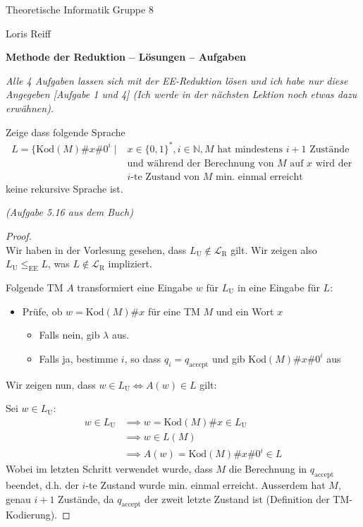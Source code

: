 \documentclass[a4paper,ngerman,12pt]{exam}
\newcommand\kod{\text{Kod}}
\newcommand\Lu{L_{\mathrm{U}}}
\newcommand\LR{\mathcal{L}_{\mathrm{R}}}
\begin{document}
\noindent Theoretische Informatik \hfill Gruppe 8

\hfill Loris Reiff

\begin{center}
  \bfseries\Large
  Methode der Reduktion \ifprintanswers
  -- Lösungen
  \else
  -- Aufgaben
\fi
\end{center}

\noindent\textit{Alle 4 Aufgaben lassen sich mit der EE-Reduktion lösen und ich habe nur diese Angegeben [Aufgabe 1 und 4] (Ich werde in der nächsten Lektion noch etwas dazu erwähnen).}

\begin{questions}
\question
Zeige dass folgende Sprache
\begin{align*}
  L = \{\kod(M)\#x\#0^i \mid &x \in \{0,1\}^*, i \in \mathbb{N}, M
  \text{ hat mindestens } i+1 \text{ Zustände} \\
  &\text{und während der Berechnung von } M
  \text{ auf } x \text{ wird der } \\
  &i \text{-te Zustand von $M$ min. einmal erreicht}
\end{align*}
keine rekursive Sprache ist.

  \textit{(Aufgabe 5.16 aus dem Buch)}
    \begin{solutionorbox}[18em]
      \begin{proof} $ $\\
      Wir haben in der Vorlesung gesehen, dass $\Lu \not\in \LR$ gilt. Wir zeigen also
      $\Lu \leq_{\mathrm{EE}} L$, was $L \not\in \LR$ impliziert.

      Folgende TM $A$ transformiert eine Eingabe $w$ für $\Lu$ in eine Eingabe für $L$:
      \begin{itemize}
      \item Prüfe, ob $w = \kod(M)\#x$ für eine TM $M$ und ein Wort $x$
      \begin{itemize}
        \item Falls nein, gib $\lambda$ aus.
        \item Falls ja, bestimme $i$, so dass $q_i = q_{\text{accept}}$
        und gib $\kod(M)\#x\#0^i$ aus
      \end{itemize}
      \end{itemize}
      Wir zeigen nun, dass $w \in \Lu \iff A(w) \in L$ gilt:

        Sei $w \in \Lu$:
        \begin{align*}
          w \in \Lu &\implies w=\kod(M)\#x \in \Lu \\
          & \implies w \in L(M) \\
          & \implies A(w) = \kod(M)\#x\#0^i \in L
        \end{align*}
        Wobei im letzten Schritt verwendet wurde, dass $M$ die Berechnung
        in $q_{\mathrm{accept}}$
        beendet, d.h. der $i$-te Zustand wurde min. einmal erreicht. Ausserdem
        hat $M$, genau $i+1$ Zustände, da $q_{\mathrm{accept}}$ der zweit letzte Zustand
        ist (Definition der TM-Kodierung).


\end{proof}
\end{solutionorbox}
\end{questions}
\end{document}
